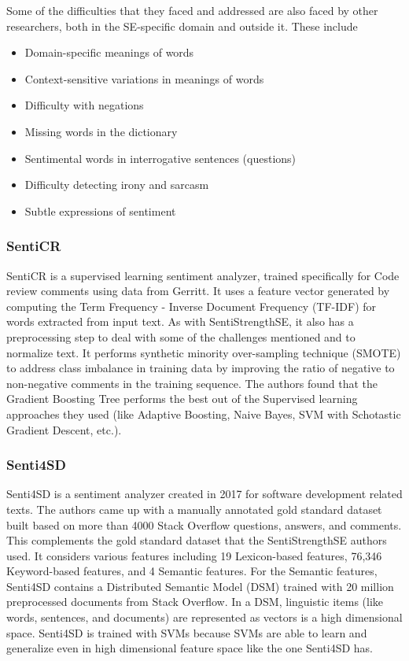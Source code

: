 \documentclass[conference]{IEEEtran}
\begin{document}
Some of the difficulties that they faced and addressed are also faced by other researchers, both in the SE-specific domain and outside it. These include
\begin{itemize}
    \item Domain-specific meanings of words
    \item Context-sensitive variations in meanings of words
    \item Difficulty with negations
    \item Missing words in the dictionary
    \item Sentimental words in interrogative sentences (questions)
    \item Difficulty detecting irony and sarcasm
    \item Subtle expressions of sentiment\\
\end{itemize}

\subsubsection{SentiCR}
SentiCR is a supervised learning sentiment analyzer, trained specifically for Code review comments using data from Gerritt. It uses a feature vector generated by computing the Term Frequency - Inverse Document Frequency (TF-IDF) for words extracted from input text. As with SentiStrengthSE, it also has a preprocessing step to deal with some of the challenges mentioned and to normalize text. It performs synthetic minority over-sampling technique (SMOTE) to address class imbalance in training data by improving the ratio of negative to non-negative comments in the training sequence. The authors found that the Gradient Boosting Tree performs the best out of the Supervised learning approaches they used\cite{19} (like Adaptive Boosting, Naive Bayes, SVM with Schotastic Gradient Descent, etc.).\\

\subsubsection{Senti4SD}
Senti4SD is a sentiment analyzer created in 2017 for software development related texts. The authors came up with a manually annotated gold standard dataset built based on more than 4000 Stack Overflow questions, answers, and comments. This complements the gold standard dataset that the SentiStrengthSE authors used. It considers various features including 19 Lexicon-based features, 76,346 Keyword-based features, and 4 Semantic features\cite{b18}. For the Semantic features, Senti4SD contains a Distributed Semantic Model (DSM) trained with 20 million preprocessed documents from Stack Overflow. In a DSM, linguistic items (like words, sentences, and documents) are represented as vectors is a high dimensional space. Senti4SD is trained with SVMs because SVMs are able to learn and generalize even in high dimensional feature space like the one Senti4SD has.\\
\end{document}
